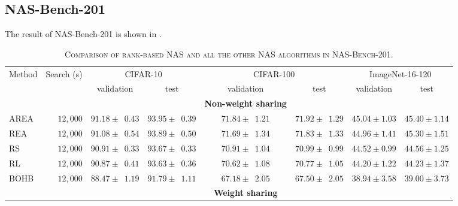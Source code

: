 \documentclass[sigconf]{acmart}
\begin{document}
    \subsection{NAS-Bench-201}
    The result of NAS-Bench-201 is shown in .
    \begin{table*}[htb]
        \newcommand{\z}{\phantom{0}}
        \caption{\textsc{Comparison of rank-based NAS and all the other NAS algorithms in NAS-Bench-201.}}
          \vspace{-\baselineskip}
        \begin{tabular}{@{}lrcccccc@{}}\toprule
        Method & Search (s) & \multicolumn{2}{c}{CIFAR-10} & \multicolumn{2}{c}{CIFAR-100} & \multicolumn{2}{c}{ImageNet-16-120} \\ \cmidrule(lr){3-4}\cmidrule(lr){5-6}\cmidrule(lr){7-8}
        & & validation & test & validation & test & validation & test \\ \midrule
        &&&&\textbf{Non-weight sharing}&&&\\
        AREA      & $12,000$ & $91.18 \pm \z{0.43}$                & $93.95 \pm \z{0.39}$               & $71.84 \pm \z{1.21}$                 & $71.92 \pm \z{1.29}$                & $45.04 \pm 1.03$                 & $45.40 \pm 1.14$                \\
        REA       & $12,000$ & $91.08 \pm \z{0.54}$                & $93.89 \pm \z{0.50}$               & $71.69 \pm \z{1.34}$                 & $71.83 \pm \z{1.33}$                & $44.96 \pm 1.41$                 & $45.30 \pm 1.51$                \\
        RS        & $12,000$ & $90.91 \pm \z{0.33}$                & $93.67 \pm \z{0.33}$               & $70.91 \pm \z{1.04}$                 & $70.99 \pm \z{0.99}$                & $44.52 \pm 0.99$                 & $44.56 \pm 1.25$                \\
        RL        & $12,000$ & $90.87 \pm \z{0.41}$                & $93.63 \pm \z{0.36}$               & $70.62 \pm \z{1.08}$                 & $70.77 \pm \z{1.05}$                & $44.20 \pm 1.22$                 & $44.23 \pm 1.37$                \\
        BOHB      & $12,000$ & $88.47 \pm \z{1.19}$                & $91.79 \pm \z{1.11}$               & $67.18 \pm \z{2.05}$                 & $67.50 \pm \z{2.05}$                & $38.94 \pm 3.58$                 & $39.00 \pm 3.73$                \\ \midrule
        &&&&\textbf{Weight sharing}&&&\\

\end{tabular}
\end{table*}
\end{document}

